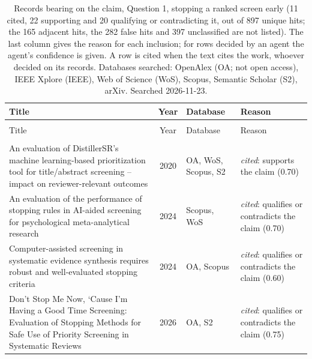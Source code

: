 
\begingroup\footnotesize
\begin{longtable}{@{}%
  >{\raggedright\arraybackslash}p{}c%
  >{\raggedright\arraybackslash}p{}%
  >{\raggedright\arraybackslash}p{}@{}}
\caption{Records bearing on the claim, Question 1, stopping a ranked screen early (11 cited, 22 supporting and 20 qualifying or contradicting it, out of 897 unique hits; the 165 adjacent hits, the 282 false hits and 397 unclassified are not listed). The last column gives the reason for each inclusion; for rows decided by an agent the agent's confidence is given. A row is cited when the text cites the work, whoever decided on its records. Databases searched: OpenAlex (OA; not open access), IEEE Xplore (IEEE), Web of Science (WoS), Scopus, Semantic Scholar (S2), arXiv. Searched 2026-11-23.}\label{tab:screenlit-q1}\\
\toprule
Title & Year & Database & Reason \\
\midrule
\endfirsthead
\multicolumn{4}{@{}l}{\emph{\tablename~\thetable{} (cont.)}}\\
\toprule
Title & Year & Database & Reason \\
\midrule
\endhead
\midrule \multicolumn{4}{r@{}}{\emph{continued on next page}}\\
\endfoot
\bottomrule
\endlastfoot
An evaluation of DistillerSR's machine learning-based prioritization tool for title/abstract screening -- impact on reviewer-relevant outcomes & 2020 & OA, WoS, Scopus, S2 & \emph{cited}: supports the claim (0.70) \\
An evaluation of the performance of stopping rules in AI-aided screening for psychological meta-analytical research & 2024 & Scopus, WoS & \emph{cited}: qualifies or contradicts the claim (0.70) \\
Computer-assisted screening in systematic evidence synthesis requires robust and well-evaluated stopping criteria & 2024 & OA, Scopus & \emph{cited}: qualifies or contradicts the claim (0.60) \\
Don't Stop Me Now, `Cause I'm Having a Good Time Screening: Evaluation of Stopping Methods for Safe Use of Priority Screening in Systematic Reviews & 2026 & OA, S2 & \emph{cited}: qualifies or contradicts the claim (0.75) \\

\end{longtable}
